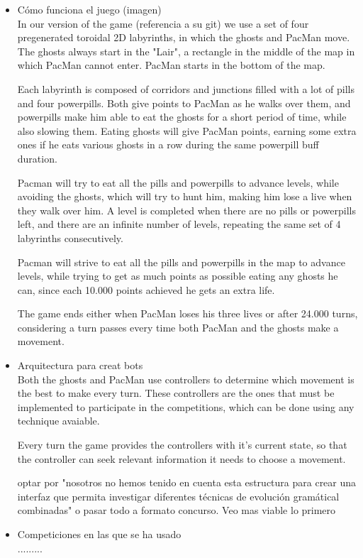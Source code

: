 \documentclass{llncs}
\begin{document}
\begin{itemize}
\item Cómo funciona el juego (imagen)
\\

In our version of the game {\color{red}(referencia a su git)} we use a set of four pregenerated toroidal 2D labyrinths, in which the ghosts and PacMan move. The ghosts always start in the "Lair", a rectangle in the middle of the map in which PacMan cannot enter. PacMan starts in the bottom of the map.

Each labyrinth is composed of corridors and junctions filled with a lot of pills and four powerpills. Both give points to PacMan as he walks over them, and powerpills make him able to eat the ghosts for a short period of time, while also slowing them. Eating ghosts will give PacMan points, earning some extra ones if he eats various ghosts in a row during the same powerpill buff duration.

Pacman will try to eat all the pills and powerpills to advance levels, while avoiding the ghosts, which will try to hunt him, making him lose a live when they walk over him. A level is completed when there are no pills or powerpills left, and there are an infinite number of levels, repeating the same set of 4 labyrinths consecutively.

Pacman will strive to eat all the pills and powerpills in the map to advance levels, while trying to get as much points as possible eating any ghosts he can, since each 10.000 points achieved he gets an extra life.

The game ends either when PacMan loses his three lives or after 24.000 turns, considering a turn passes every time both PacMan and the ghosts make a movement.


\item Arquitectura para creat bots
\\

Both the ghosts and PacMan use controllers to determine which movement is the best to make every turn. These controllers are the ones that must be implemented to participate in the competitions, which can be done using any technique avaiable.

Every turn the game provides the controllers with it's current state, so that the controller can seek relevant information it needs to choose a movement. 

{\color{red}optar por "nosotros no hemos tenido en cuenta esta estructura para crear una interfaz que permita investigar diferentes técnicas de evolución gramátical combinadas" o pasar todo a formato concurso. Veo mas viable lo primero}


\item Competiciones en las que se ha usado
\\

.........


\end{itemize}
\end{document}
